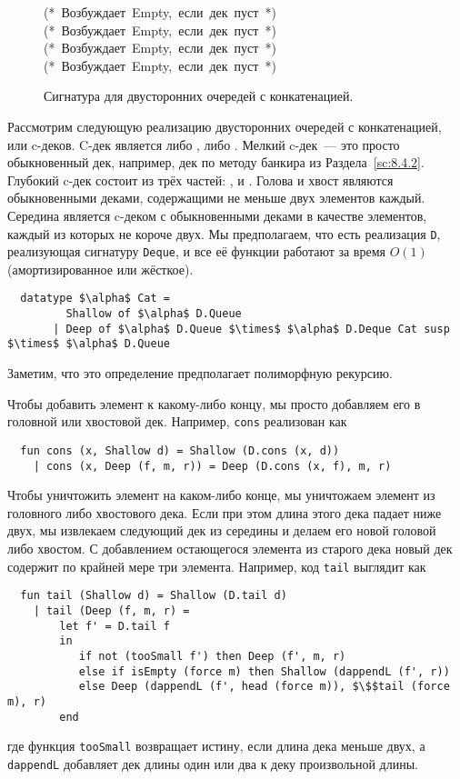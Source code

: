 \begin{figure}
  \centering
  
  (*\mbox{ Возбуждает }Empty\mbox{, если дек пуст }*)\\
  (*\mbox{ Возбуждает }Empty\mbox{, если дек пуст }*)\\
  (*\mbox{ Возбуждает }Empty\mbox{, если дек пуст }*)\\
  (*\mbox{ Возбуждает }Empty\mbox{, если дек пуст }*)\\
  
  \caption{Сигнатура для двусторонних очередей с конкатенацией.}
  \label{fig:11.2}
\end{figure}

Рассмотрим следующую реализацию двусторонних очередей с конкатенацией,
или c-деков. C-дек является либо , либо
. Мелкий c-дек~--- это просто обыкновенный дек,
например, дек по методу банкира из Раздела~\ref{sc:8.4.2}. Глубокий
c-дек состоит из трёх частей: ,
 и . Голова и хвост являются
обыкновенными деками, содержащими не меньше двух элементов
каждый. Середина является c-деком с обыкновенными деками в качестве
элементов, каждый из которых не короче двух. Мы предполагаем, что есть
реализация \lstinline!D!, реализующая сигнатуру \lstinline!Deque!, и
все её функции работают за время $O(1)$ (амортизированное или
жёсткое).
\begin{lstlisting}
  datatype $\alpha$ Cat =
         Shallow of $\alpha$ D.Queue
       | Deep of $\alpha$ D.Queue $\times$ $\alpha$ D.Deque Cat susp $\times$ $\alpha$ D.Queue
\end{lstlisting}
Заметим, что это определение предполагает полиморфную рекурсию.

Чтобы добавить элемент к какому-либо концу, мы просто добавляем его в
головной или хвостовой дек. Например, \lstinline!cons! реализован как
\begin{lstlisting}
  fun cons (x, Shallow d) = Shallow (D.cons (x, d))
    | cons (x, Deep (f, m, r)) = Deep (D.cons (x, f), m, r)
\end{lstlisting}
Чтобы уничтожить элемент на каком-либо конце, мы уничтожаем элемент из
головного либо хвостового дека. Если при этом длина этого дека падает
ниже двух, мы извлекаем следующий дек из середины и делаем его новой
головой либо хвостом. С добавлением остающегося элемента из старого
дека новый дек содержит по крайней мере три элемента. Например, код
\lstinline!tail! выглядит как
\begin{lstlisting}
  fun tail (Shallow d) = Shallow (D.tail d)
    | tail (Deep (f, m, r) =
        let f' = D.tail f
        in
           if not (tooSmall f') then Deep (f', m, r)
           else if isEmpty (force m) then Shallow (dappendL (f', r))
           else Deep (dappendL (f', head (force m)), $\$$tail (force m), r)
        end
\end{lstlisting}
где функция \lstinline!tooSmall! возвращает истину, если длина дека
меньше двух, а \lstinline!dappendL! добавляет дек длины один или два к
деку произвольной длины.

